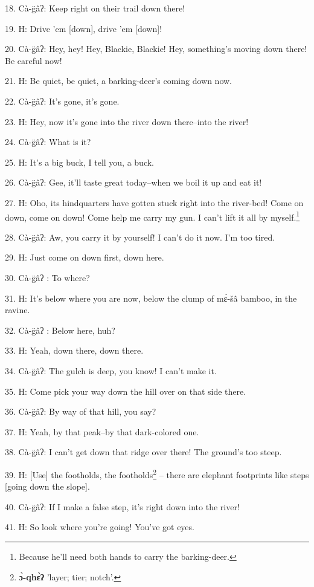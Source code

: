 18. Cà-g̈âʔ: Keep right on their trail down there!

19. H: Drive 'em [down], drive 'em [down]!

20. Cà-g̈âʔ: Hey, hey! Hey, Blackie, Blackie! Hey, something's moving down
there! Be careful now!

21. H: Be quiet, be quiet, a barking-deer's coming down now.

22. Cà-g̈âʔ: It's gone, it's gone.


23. H: Hey, now it's gone into the river down there--into the river!

24. Cà-g̈âʔ: What is it?

25. H: It's a big buck, I tell you, a buck.

26. Cà-g̈âʔ: Gee, it'll taste great today--when we boil it up and eat it!

27. H: Oho, its hindquarters have gotten stuck right into the river-bed! Come on
down, come on down! Come help me carry my gun. I can't lift it all by myself.\footnote{Because he'll need both hands to carry the barking-deer.}

28. Cà-g̈âʔ: Aw, you carry it by yourself! I can't do it now. I'm too tired.

29. H: Just come on down first, down here.

30. Cà-g̈âʔ : To where?

31. H: It's below where you are now, below the clump of mɛ̀-šâ bamboo, in the
ravine.

32. Cà-g̈âʔ : Below here, huh?

33. H: Yeah, down there, down there.

34. Cà-g̈âʔ: The gulch is deep, you know! I can't make it.

35. H: Come pick your way down the hill over on that side there.

36. Cà-g̈âʔ: By way of that hill, you say?

37. H: Yeah, by that peak--by that dark-colored one.

38. Cà-g̈âʔ: I can't get down that ridge over there! The ground's too steep.

39. H: [Use] the footholds, the footholds\footnote{\textbf{ɔ̀-qhɛ̀ʔ} 'layer; tier; notch'.} -- there are elephant footprints like
steps [going down the slope].

40. Cà-g̈âʔ: If I make a false step, it's right down into the river!

41. H: So look where you're going! You've got eyes.

